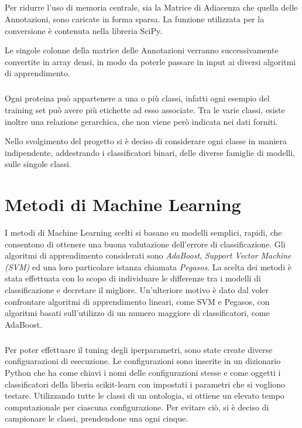\documentclass[12pt,a4paper,oneside,hidelinks]{report}
\begin{document}
\paragraph*{} 
Per ridurre l'uso di memoria centrale, sia la Matrice di Adiacenza che quella delle Annotazioni, sono caricate in forma sparsa. La funzione utilizzata per la conversione è contenuta nella libreria SciPy.

Le singole colonne della matrice delle Annotazioni verranno successivamente convertite in array densi, in modo da poterle passare in input ai diversi algoritmi di apprendimento. 

\paragraph*{}
Ogni proteina può appartenere a una o più classi, infatti ogni esempio del training set può avere più etichette ad esso associate. Tra le varie classi, esiste inoltre una relazione gerarchica, che non viene però indicata nei dati forniti. 

Nello svolgimento del progetto si è deciso di considerare ogni classe in maniera indipendente, addestrando i classificatori binari, delle diverse famiglie di modelli, sulle singole classi.


\chapter{Metodi di Machine Learning} 
\label{chap:metodi}

I metodi di Machine Learning scelti si basano su modelli semplici, rapidi, che consentono di ottenere una buona valutazione dell'errore di classificazione. Gli algoritmi di apprendimento considerati sono \textit{AdaBoost}, \textit{Support Vector Machine (SVM)} ed una loro particolare istanza chiamata \textit{Pegasos}. La scelta dei metodi è stata effettuata con lo scopo di individuare le differenze tra i modelli di classificazione e decretare il migliore. Un'ulteriore motivo è dato dal voler confrontare algoritmi di apprendimento lineari, come SVM e Pegasos, con algoritmi basati sull'utilizzo di un numero maggiore di classificatori, come AdaBoost.

\paragraph*{}
Per poter effettuare il tuning degli iperparametri, sono state create diverse configuarazioni di esecuzione.
Le configurazioni sono inserite in un dizionario Python che ha come chiavi i nomi delle configurazioni stesse e come oggetti i classificatori della liberia scikit-learn con impostati i parametri che si vogliono testare.
Utilizzando tutte le classi di un ontologia, si ottiene un elevato tempo computazionale per ciascuna configurazione. Per evitare ciò, si è deciso di campionare le classi, prendendone una ogni cinque.
 
\end{document}
